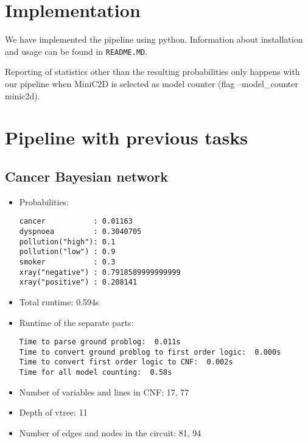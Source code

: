 \section{Implementation}
We have implemented the pipeline using python. Information about installation and usage can be found in \texttt{README.MD}.

Reporting of statistics other than the resulting probabilities only happens with our pipeline when MiniC2D is selected as model counter (flag --model\_counter minic2d).

\section{Pipeline with previous tasks}
\subsection{Cancer Bayesian network}
\begin{itemize}
    \item Probabilities:
    \begin{lstlisting}
cancer           : 0.01163
dyspnoea         : 0.3040705
pollution("high"): 0.1
pollution("low") : 0.9
smoker           : 0.3
xray("negative") : 0.7918589999999999
xray("positive") : 0.208141
    \end{lstlisting}
    \item Total runtime: 0.594s
    \item Runtime of the separate parts:
    \begin{lstlisting}
Time to parse ground problog:  0.011s
Time to convert ground problog to first order logic:  0.000s
Time to convert first order logic to CNF:  0.002s
Time for all model counting:  0.58s
    \end{lstlisting}
    \item Number of variables and lines in CNF: 17, 77
    \item Depth of vtree: 11
    \item Number of edges and nodes in the circuit: 81, 94
\end{itemize}
